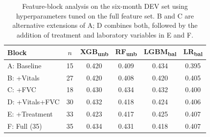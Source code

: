 \begin{table}[ht]
\centering
\caption[Feature block ablation, 6-month horizon]{Feature-block analysis on the six-month DEV set using hyperparameters tuned on the full feature set. B and C are alternative extensions of A; D combines both, followed by the addition of treatment and laboratory variables in E and F.}
\label{tab:ablation_v2}
\small
\begin{tabular}{lccccc}
\toprule
Block & $n$ & XGB\textsubscript{unb} & RF\textsubscript{unb} & LGBM\textsubscript{bal} & LR\textsubscript{bal} \\
\midrule
A: Baseline & 15 & 0.420 & 0.409 & 0.434 & 0.395 \\
B: +Vitals & 27 & 0.420 & 0.408 & 0.420 & 0.405 \\
C: +FVC & 18 & 0.430 & 0.434 & 0.432 & 0.400 \\
D: +Vitals+FVC & 30 & 0.432 & 0.418 & 0.424 & 0.406 \\
E: +Treatment & 33 & 0.423 & 0.417 & 0.425 & 0.407 \\
F: Full (35) & 35 & 0.434 & 0.431 & 0.418 & 0.407 \\
\bottomrule
\end{tabular}
\end{table}
